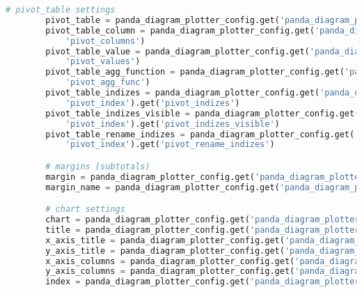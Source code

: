 \begin{lstlisting}[language=python, caption=Python LaTex - pandas\_data\_chart\_plotter.py CSV - Diagramm,captionpos=b,label={lst:pandas_data_chart_plotter},breaklines=true]
        # pivot_table settings
        pivot_table = panda_diagram_plotter_config.get('panda_diagram_plotter').get(table_item).get('pivot_table')
        pivot_table_column = panda_diagram_plotter_config.get('panda_diagram_plotter').get(table_item).get('pivot_table').get(
            'pivot_columns')
        pivot_table_value = panda_diagram_plotter_config.get('panda_diagram_plotter').get(table_item).get('pivot_table').get(
            'pivot_values')
        pivot_table_agg_function = panda_diagram_plotter_config.get('panda_diagram_plotter').get(table_item).get('pivot_table').get(
            'pivot_agg_func')
        pivot_table_indizes = panda_diagram_plotter_config.get('panda_diagram_plotter').get(table_item).get('pivot_table').get(
            'pivot_index').get('pivot_indizes')
        pivot_table_indizes_visible = panda_diagram_plotter_config.get('panda_diagram_plotter').get(table_item).get('pivot_table').get(
            'pivot_index').get('pivot_indizes_visible')
        pivot_table_rename_indizes = panda_diagram_plotter_config.get('panda_diagram_plotter').get(table_item).get('pivot_table').get(
            'pivot_index').get('pivot_rename_indizes')

        # margins (subtotals)
        margin = panda_diagram_plotter_config.get('panda_diagram_plotter').get(table_item).get('margins').get('margin')
        margin_name = panda_diagram_plotter_config.get('panda_diagram_plotter').get(table_item).get('margins').get('margin_name')

        # chart settings
        chart = panda_diagram_plotter_config.get('panda_diagram_plotter').get(table_item).get('chart-kind')
        title = panda_diagram_plotter_config.get('panda_diagram_plotter').get(table_item).get('title')
        x_axis_title = panda_diagram_plotter_config.get('panda_diagram_plotter').get(table_item).get('x-axis-title')
        y_axis_title = panda_diagram_plotter_config.get('panda_diagram_plotter').get(table_item).get('y-axis-title')
        x_axis_columns = panda_diagram_plotter_config.get('panda_diagram_plotter').get(table_item).get('x-axis-columns')
        y_axis_columns = panda_diagram_plotter_config.get('panda_diagram_plotter').get(table_item).get('y-axis-columns')
        index = panda_diagram_plotter_config.get('panda_diagram_plotter').get(table_item).get('chart-index')


\end{lstlisting}
